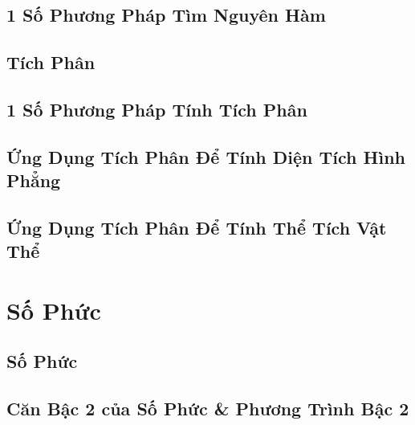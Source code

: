 \documentclass[12pt]{article}
\numberwithin{equation}{section}
\begin{document}

\subsection{1 Số Phương Pháp Tìm Nguyên Hàm}


\subsection{Tích Phân}


\subsection{1 Số Phương Pháp Tính Tích Phân}


\subsection{Ứng Dụng Tích Phân Để Tính Diện Tích Hình Phẳng}


\subsection{Ứng Dụng Tích Phân Để Tính Thể Tích Vật Thể}


\section{Số Phức}

\subsection{Số Phức}


\subsection{Căn Bậc 2 của Số Phức \& Phương Trình Bậc 2}
\end{document}
